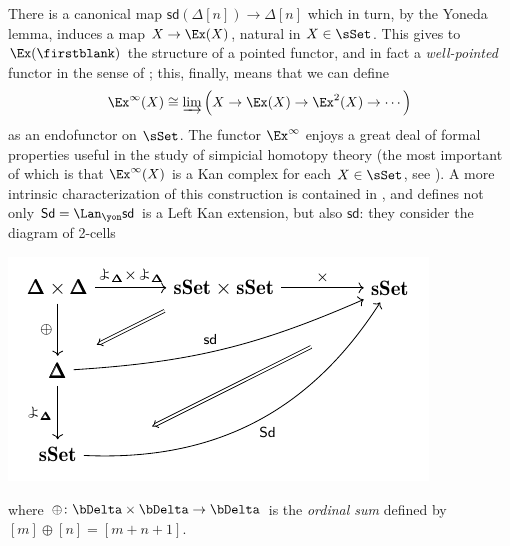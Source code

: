 \begin{example}
There is a canonical map $\textsf{sd}(\Delta[n]) \to \Delta[n]$ which in turn, by the Yoneda lemma, induces a map $X\to \Ex(X)$, natural in $X\in\sSet$. This gives to $\Ex(\firstblank)$ the structure of a pointed functor, and in fact a \emph{well\hyp{}pointed} functor in the sense of \cite{kelly1980unified}; this, finally, means that we can define
\[
\Ex^\infty(X) \cong \varinjlim\Big( X \to \Ex(X) \to \Ex^2(X) \to \cdots\Big)
\]
as an endofunctor on $\sSet$. The functor $\Ex^\infty$ enjoys a great deal of formal properties useful in the study of simpicial homotopy theory (the most important of which is that $\Ex^\infty(X)$ is a Kan complex for each $X\in\sSet$, see \cite{GoJ}). A more intrinsic characterization of this construction is contained in \cite{ehlers2008ordinal}, and defines not only $\textsf{Sd} = \Lan_\yon\textsf{sd}$ is a Left Kan extension, but also $\textsf{sd}$: they consider the diagram of 2-cells
\begin{center}
\includegraphics[scale=1]{figures/fig3}
\end{center}
where $\oplus \colon \bDelta\times\bDelta\to \bDelta$ is the \emph{ordinal sum} defined by $[m]\oplus[n] = [m+n+1]$.
\end{example}
